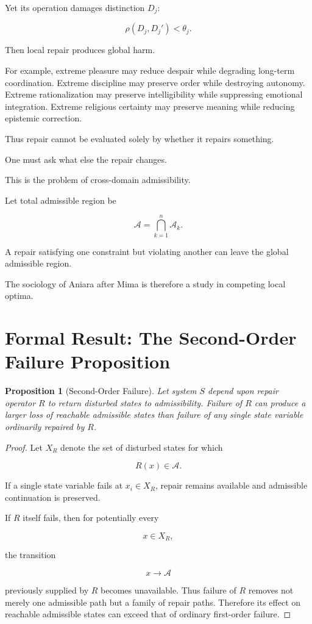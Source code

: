 \documentclass[11pt,oneside]{book}
\newtheorem{proposition}[theorem]{Proposition}
\theoremstyle{definition}
\theoremstyle{remark}
\newcommand{\A}{\mathcal{A}}
\begin{document}
Yet its operation damages distinction \(D_j\):

\[
\rho(D_j,D_j')<\theta_j.
\]

Then local repair produces global harm.

For example, extreme pleasure may reduce despair while degrading long-term coordination. Extreme discipline may preserve order while destroying autonomy. Extreme rationalization may preserve intelligibility while suppressing emotional integration. Extreme religious certainty may preserve meaning while reducing epistemic correction.

Thus repair cannot be evaluated solely by whether it repairs something.

One must ask what else the repair changes.

This is the problem of cross-domain admissibility.

Let total admissible region be

\[
\A
=
\bigcap_{k=1}^{n}
\A_k.
\]

A repair satisfying one constraint but violating another can leave the global admissible region.

The sociology of Aniara after Mima is therefore a study in competing local optima.

\section{Formal Result: The Second-Order Failure Proposition}

\begin{proposition}[Second-Order Failure]
Let system \(S\) depend upon repair operator \(R\) to return disturbed states to admissibility. Failure of \(R\) can produce a larger loss of reachable admissible states than failure of any single state variable ordinarily repaired by \(R\).
\end{proposition}

\begin{proof}
Let \(X_R\) denote the set of disturbed states for which

\[
R(x)\in\A.
\]

If a single state variable fails at \(x_i\in X_R\), repair remains available and admissible continuation is preserved.

If \(R\) itself fails, then for potentially every

\[
x\in X_R,
\]

the transition

\[
x\rightarrow\A
\]

previously supplied by \(R\) becomes unavailable. Thus failure of \(R\) removes not merely one admissible path but a family of repair paths. Therefore its effect on reachable admissible states can exceed that of ordinary first-order failure.
\end{proof}
\end{document}
